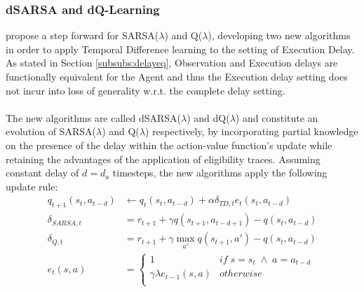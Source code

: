             \subsubsection{dSARSA and dQ-Learning}
                 propose a step forward for SARSA($\lambda$) and Q($\lambda$), developing two new algorithms in order to apply Temporal Difference learning to the setting of Execution Delay. As stated in Section \ref{subsubs:delayeq}, Observation and Execution delays are functionally equivalent for the Agent and thus the Execution delay setting does not incur into loss of generality w.r.t. the complete delay setting. 
                \\\\
                The new algorithms are called dSARSA($\lambda$) and dQ($\lambda$) and constitute an evolution of SARSA($\lambda$) and Q($\lambda$) respectively, by incorporating partial knowledge on the presence of the delay within the action-value function's update while retaining the advantages of the application of eligibility traces. Assuming constant delay of $d = d_a$ timesteps, the new algorithms apply the following update rule:
                \begin{align*}
                    q_{t+1}(s_t, a_{t-d}) &\leftarrow q_{t}(s_t, a_{t-d}) + \alpha \delta_{TD, t} e_t(s_t, a_{t-d})\\
                    \delta_{SARSA, t}    &= r_{t+1} + \gamma q(s_{t+1}, a_{t-d+1}) - q(s_t, a_{t-d})\\
                    \delta_{Q, t}        &= r_{t+1} + \gamma \max_{a'} q(s_{t+1}, a') - q(s_t, a_{t-d})\\
                    e_{t}(s,a) &= 
                            \begin{cases} 
                                1 & if \; s = s_t \; \wedge \; a = a_{t-d} \\
                                \gamma \lambda e_{t-1}(s, a) & otherwise \\ 
                            \end{cases}
                \end{align*}
                
